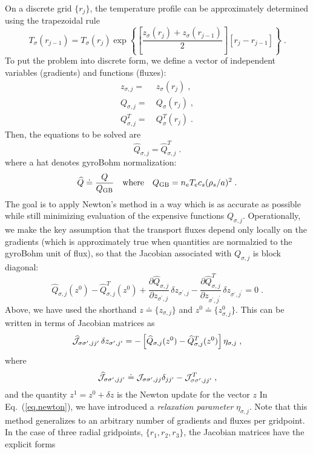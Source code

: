 \documentclass[12pt]{article}
\newcommand\qgb{Q_{\rm GB}}
\newcommand\qhat{\widehat{Q}}
\newcommand\jhat{\widehat{{\cal J}}}
\newcommand{\sj}{{\sigma,j}}
\newcommand{\sspjjp}{{\sigma\sigma^\prime,jj^\prime}}
\newcommand{\spjp}{{\sigma^\prime,j^\prime}}
\newcommand{\spj}{{\sigma^\prime,j}}
\begin{document}
On a discrete grid $\{r_j\}$, the temperature profile can 
be approximately determined using the trapezoidal rule 
%
\begin{equation}
T_\sigma(r_{j-1}) = T_\sigma(r_j) \exp \left\{
 \left[ \frac{z_\sigma(r_j)+z_\sigma(r_{j-1})}{2} \right]
 \left[ r_j-r_{j-1} \right] \right\} \; .
\end{equation}
%
To put the problem into discrete form, we define a vector of 
independent variables (gradients) and functions (fluxes):
%
\begin{align}
z_\sj = &~ z_\sigma(r_j) \; , \\
Q_\sj = &~ Q_\sigma(r_j) \; , \\
Q^T_\sj = &~ Q^T_\sigma(r_j) \; .
\end{align}
%
Then, the equations to be solved are
%
\begin{equation}
\qhat_\sj = \qhat^T_\sj  \; .
\end{equation}
%
where a hat denotes gyroBohm normalization:
%
\begin{equation}
\qhat \doteq \frac{Q}{\qgb} 
\quad \text{where} \quad \qgb = n_e T_e c_s (\rho_s/a)^2 \; .
\end{equation}
%
The goal is to apply Newton's method in a way which is as accurate 
as possible while still minimizing evaluation of the expensive functions 
$Q_\sj$.  Operationally, we make the key assumption that the transport 
fluxes depend only locally on the gradients (which is approximately 
true when quantities are normalzied to the gyroBohm unit of flux), 
so that the Jacobian associated with $Q_\sj$ is block diagonal:
%
\begin{equation}
\qhat_\sj(z^0) - \qhat^T_\sj(z^0) 
 + \frac{\partial \qhat_\sj}{\partial z_\spj} \,\delta z_\spj 
 - \frac{\partial \qhat^T_\sj}{\partial z_\spjp} \, \delta z_\spjp
 = 0 \; .
\end{equation}
%
Above, we have used the shorthand $z \doteq \{z_\sj\}$ and 
$z^0 \doteq \{z^0_\sj\}$.  This can be written in terms of 
Jacobian matrices as
%
\begin{equation}
\jhat_{\sspjjp} \, \delta z_{\sigma^\prime,j^\prime} = 
 -\left[ \qhat_\sj(z^0) - \qhat^T_\sj(z^0) \right] \eta_\sj \; ,
\label{eq.newton}
\end{equation}
%
where 
%
\begin{equation}
\jhat_\sspjjp \doteq {\cal J}_{\sigma\sigma^\prime,jj} \delta_{jj^\prime}
 -{\cal J}^T_{\sspjjp}\; ,
\end{equation}
%
and the quantity $z^1 = z^0 + \delta z$ is the Newton 
update for the vector $z$  In Eq.~(\ref{eq.newton}), we have
introduced a {\it relaxation parameter} $\eta_\sj$. Note that 
this method generalizes 
to an arbitrary number of gradients and fluxes per gridpoint.  
In the case of three radial gridpoints, $\{r_1,r_2,r_3\}$, 
the Jacobian matrices have the explicit forms
\end{document}
